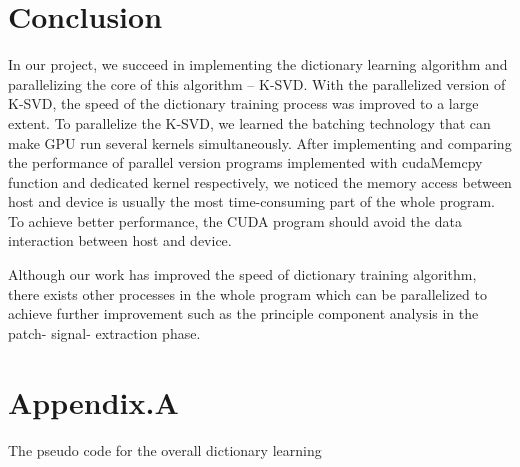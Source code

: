 \documentclass[english]{cccconf}
\begin{document}
\section{Conclusion}
In our project, we succeed in implementing the dictionary learning algorithm and parallelizing the core of this algorithm – K-SVD. With the parallelized version of K-SVD, the speed of the dictionary training process was improved to a large extent. To parallelize the K-SVD, we learned the batching technology that can make GPU run several kernels simultaneously. After implementing and comparing the performance of parallel version programs implemented with cudaMemcpy function and dedicated  kernel respectively, we noticed the memory access between host and device is usually the most time-consuming part of the whole program. To achieve better performance, the CUDA program should avoid the data interaction between host and device. 
 
Although our work has improved the speed of dictionary training algorithm, there exists other processes in the whole program which can be parallelized to achieve further improvement such as the principle component analysis in the patch- signal- extraction phase. 



\section{Appendix.A}
The pseudo code for the overall dictionary learning
\end{document}
